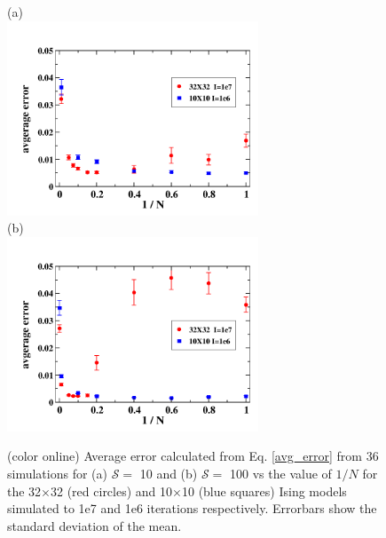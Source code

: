 \documentclass[aps,pre,reprint,superscriptaddress,showkeys]{revtex4-1}
\begin{document}
\begin{figure}[h!]
(a)\\
\includegraphics[width=7.5cm]{./figures/rangeN_3232_and_1010_S10.png}\\
(b)\\
\includegraphics[width=7.5cm]{./figures/rangeN_3232_1010_S100.png}\\

\caption{(color online) Average error calculated from Eq. \ref{avg_error} from 36 simulations for (a) $\mathcal{S}=$ 10 and (b) $\mathcal{S}=$ 100   vs the value of $1/N$ for the 32$\times$32 (red circles) and 10$\times$10 (blue squares) Ising models simulated to 1e7 and 1e6 iterations respectively.  Errorbars show the standard deviation of the mean. \label{N_dependence}}
\end{figure}
\end{document}
